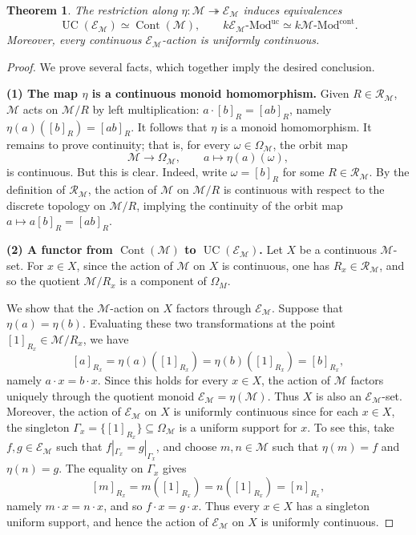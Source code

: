 \documentclass[10pt, reqno]{amsart}
\theoremstyle{plain}
\newtheorem{theorem}{Theorem}[section]
\numberwithin{equation}{section}
\theoremstyle{definition}
\newcommand{\Mod}{{\textrm{-}\mathrm{Mod}}}
\newcommand{\Cont}{\operatorname{Cont}}
\newcommand{\UC}{\operatorname{UC}}
\newcommand{\M}{\mathscr M}
\newcommand{\E}{\mathscr E}
\newcommand{\Rcal}{\mathcal R}
\begin{document}
\begin{theorem}\label{thm:universal-realization}
The restriction along $\eta: \M \twoheadrightarrow \E_\M$ induces equivalences
\[
\UC(\E_\M) \simeq \Cont(\M), \qquad k\E_\M \Mod^{\mathrm{uc}} \simeq k\M \Mod^{\mathrm{cont}}.
\]
Moreover, every continuous $\E_\M$-action is uniformly continuous.
\end{theorem}

\begin{proof}
We prove several facts, which together imply the desired conclusion.

\medskip
\noindent
\textbf{(1) The map $\eta$ is a continuous monoid homomorphism.} Given $R \in \Rcal_\M$, $\M$ acts on $\M/R$ by left multiplication: $a \cdot[b]_R=[ab]_R$, namely $\eta(a)([b]_R)=[ab]_R$. It follows that $\eta$ is a monoid homomorphism. It remains to prove continuity; that is, for every $\omega \in \Omega_\M$, the orbit map
\[
\M \longrightarrow \Omega_\M, \qquad a \longmapsto \eta(a)(\omega),
\]
is continuous. But this is clear. Indeed, write $\omega = [b]_R$ for some $R \in \Rcal_\M$. By the definition of $\Rcal_\M$, the action of $\M$ on $\M/R$ is continuous with respect to the discrete topology on $\M/R$, implying the continuity of the orbit map $a \mapsto a[b]_R=[ab]_R$.

\medskip
\noindent
\textbf{(2) A functor from $\Cont(\M)$ to $\UC(\E_\M)$.} Let $X$ be a continuous $\M$-set. For $x\in X$, since the action of $\M$ on $X$ is continuous, one has $R_x \in \Rcal_\M$, and so the quotient $\M/R_x$ is a component of $\Omega_M$.

We show that the $\M$-action on $X$ factors through $\E_\M$. Suppose that $\eta(a) = \eta(b)$. Evaluating these two transformations at the point $[1]_{R_x} \in \M/R_x$, we have
\[
[a]_{R_x} = \eta(a)([1]_{R_x}) = \eta(b)([1]_{R_x}) = [b]_{R_x},
\]
namely $a \cdot x = b \cdot x$. Since this holds for every $x \in X$, the action of $\M$ factors uniquely through the quotient monoid $\E_\M = \eta(\M)$. Thus $X$ is also an $\E_\M$-set. Moreover, the action of $\E_\M$ on $X$ is uniformly continuous since for each $x \in X$, the singleton $\Gamma_x = \{[1]_{R_x}\} \subseteq \Omega_\M$ is a uniform support for $x$. To see this, take $f, g \in \E_\M$ such that $f|_{\Gamma_x} = g|_{\Gamma_x}$, and choose $m, n \in \M$ such that $\eta(m) = f$ and $\eta(n) = g$. The equality on $\Gamma_x$ gives
\[
[m]_{R_x} = m([1]_{R_x}) = n([1]_{R_x}) = [n]_{R_x},
\]
namely $m \cdot x = n \cdot x$, and so $f \cdot x = g \cdot x$. Thus every $x \in X$ has a singleton uniform support, and hence the action of $\E_\M$ on $X$ is uniformly continuous.


\end{proof}
\end{document}

